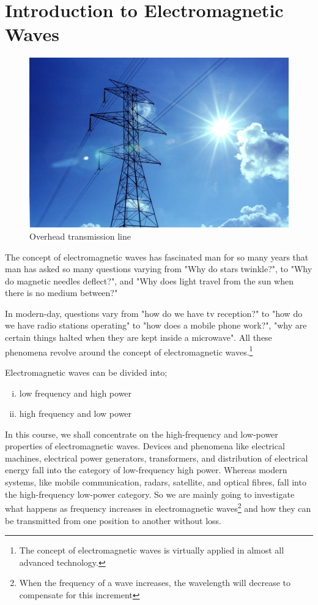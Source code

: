 \chapter{Introduction to Electromagnetic Waves}\label{lec:lec1}

\begin{figure}[h]
\centering
\includegraphics[width=1\linewidth]{./graphics/transmission1}
\caption{Overhead transmission line}
\end{figure}

The concept of electromagnetic waves has fascinated man for so many years that man has asked so many questions varying from "Why do stars twinkle?", to "Why do magnetic needles deflect?", and "Why does light travel from the sun when there is no medium between?"

In modern-day, questions vary from "how do we have tv reception?" to "how do we have radio stations operating" to "how does a mobile phone work?", "why are certain things halted when they are kept inside a microwave". All these phenomena revolve around the concept of electromagnetic waves.\footnote{The concept of electromagnetic waves is virtually applied in almost all advanced technology.}

Electromagnetic waves can be divided into;
\begin{enumerate}[(i)]
\item low frequency and high power
\item high frequency and low power
\end{enumerate}

In this course, we shall concentrate on the high-frequency and low-power properties of electromagnetic waves. Devices and phenomena like electrical machines, electrical power generators, transformers, and distribution of electrical energy fall into the category of low-frequency high power. Whereas modern systems, like mobile communication, radars, satellite, and optical fibres, fall into the high-frequency low-power category. So we are mainly going to investigate what happens as frequency increases in electromagnetic waves\footnote{When the frequency of a wave increases, the wavelength will decrease to compensate for this increment} and how they can be transmitted from one position to another without loss.

